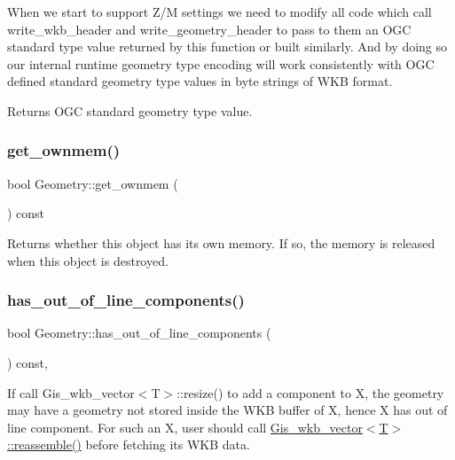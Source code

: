 When we start to support Z/M settings we need to modify all code which call write\+\_\+wkb\+\_\+header and write\+\_\+geometry\+\_\+header to pass to them an O\+GC standard type value returned by this function or built similarly. And by doing so our internal runtime geometry type encoding will work consistently with O\+GC defined standard geometry type values in byte strings of W\+KB format.

\begin{DoxyReturn}{Returns}
O\+GC standard geometry type value. 
\end{DoxyReturn}
\mbox{\label{classGeometry_ac2f735f86392075949ec67c3749d86d7}} 
\subsubsection{\texorpdfstring{get\+\_\+ownmem()}{get\_ownmem()}}
{\footnotesize\ttfamily bool Geometry\+::get\+\_\+ownmem (\begin{DoxyParamCaption}{ }\end{DoxyParamCaption}) const\hspace{0.3cm}{\ttfamily [inline]}}

Returns whether this object has its own memory. If so, the memory is released when this object is destroyed. \mbox{\label{classGeometry_a4b4f4a21518909f1427a82ac17ef4f6e}} 
\subsubsection{\texorpdfstring{has\+\_\+out\+\_\+of\+\_\+line\+\_\+components()}{has\_out\_of\_line\_components()}}
{\footnotesize\ttfamily bool Geometry\+::has\+\_\+out\+\_\+of\+\_\+line\+\_\+components (\begin{DoxyParamCaption}{ }\end{DoxyParamCaption}) const\hspace{0.3cm}{\ttfamily [inline]}, {\ttfamily [protected]}}

If call Gis\+\_\+wkb\+\_\+vector$<$\+T$>$\+::resize() to add a component to X, the geometry may have a geometry not stored inside the W\+KB buffer of X, hence X has out of line component. For such an X, user should call \mbox{\hyperlink{classGis__wkb__vector_a570dda402fe9aef5438098fe5714086c}{Gis\+\_\+wkb\+\_\+vector$<$\+T$>$\+::reassemble()}} before fetching its W\+KB data. \mbox{\label{classGeometry_ada614004627a9e7af129e51a34242af9}} 
